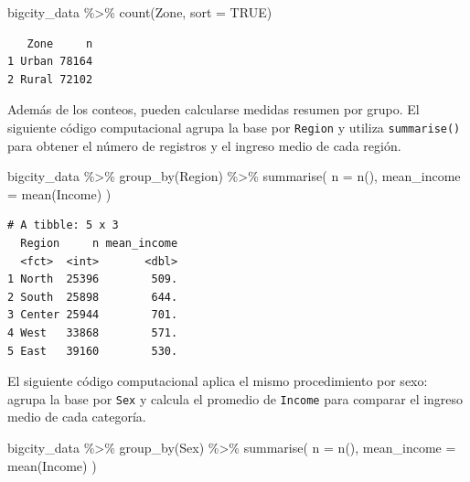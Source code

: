 \documentclass[
  spanish,
  11pt,
  letterpaper,
  oneside,
  open=any]{scrbook}
\newenvironment{Shaded}{\begin{snugshade}}{\end{snugshade}}
\newcommand{\AttributeTok}[1]{\textcolor[rgb]{0.40,0.45,0.13}{#1}}
\newcommand{\ConstantTok}[1]{\textcolor[rgb]{0.56,0.35,0.01}{#1}}
\newcommand{\FunctionTok}[1]{\textcolor[rgb]{0.28,0.35,0.67}{#1}}
\newcommand{\NormalTok}[1]{\textcolor[rgb]{0.00,0.23,0.31}{#1}}
\newcommand{\SpecialCharTok}[1]{\textcolor[rgb]{0.37,0.37,0.37}{#1}}
\begin{document}
\begin{Shaded}
\begin{Highlighting}[]
\NormalTok{bigcity\_data }\SpecialCharTok{\%\textgreater{}\%}
  \FunctionTok{count}\NormalTok{(Zone, }\AttributeTok{sort =} \ConstantTok{TRUE}\NormalTok{)}
\end{Highlighting}
\end{Shaded}

\begin{verbatim}
   Zone     n
1 Urban 78164
2 Rural 72102
\end{verbatim}

Además de los conteos, pueden calcularse medidas resumen por grupo. El
siguiente código computacional agrupa la base por \texttt{Region} y
utiliza \texttt{summarise()} para obtener el número de registros y el
ingreso medio de cada región.

\begin{Shaded}
\begin{Highlighting}[]
\NormalTok{bigcity\_data }\SpecialCharTok{\%\textgreater{}\%}
  \FunctionTok{group\_by}\NormalTok{(Region) }\SpecialCharTok{\%\textgreater{}\%}
  \FunctionTok{summarise}\NormalTok{(}
    \AttributeTok{n =} \FunctionTok{n}\NormalTok{(),}
    \AttributeTok{mean\_income =} \FunctionTok{mean}\NormalTok{(Income)}
\NormalTok{  )}
\end{Highlighting}
\end{Shaded}

\begin{verbatim}
# A tibble: 5 x 3
  Region     n mean_income
  <fct>  <int>       <dbl>
1 North  25396        509.
2 South  25898        644.
3 Center 25944        701.
4 West   33868        571.
5 East   39160        530.
\end{verbatim}

El siguiente código computacional aplica el mismo procedimiento por
sexo: agrupa la base por \texttt{Sex} y calcula el promedio de
\texttt{Income} para comparar el ingreso medio de cada categoría.

\begin{Shaded}
\begin{Highlighting}[]
\NormalTok{bigcity\_data }\SpecialCharTok{\%\textgreater{}\%}
  \FunctionTok{group\_by}\NormalTok{(Sex) }\SpecialCharTok{\%\textgreater{}\%}
  \FunctionTok{summarise}\NormalTok{(}
    \AttributeTok{n =} \FunctionTok{n}\NormalTok{(),}
    \AttributeTok{mean\_income =} \FunctionTok{mean}\NormalTok{(Income)}
\NormalTok{  )}
\end{Highlighting}
\end{Shaded}
\end{document}
